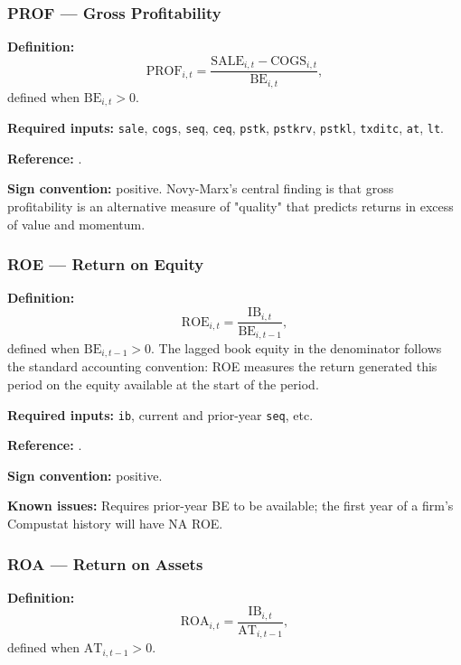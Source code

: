 \subsubsection{PROF --- Gross Profitability}

\textbf{Definition:}
\begin{equation}
\mathrm{PROF}_{i,t} = \frac{\mathrm{SALE}_{i,t} - \mathrm{COGS}_{i,t}}
                           {\mathrm{BE}_{i,t}},
\label{eq:prof}
\end{equation}
defined when $\mathrm{BE}_{i,t} > 0$.

\textbf{Required inputs:} \texttt{sale}, \texttt{cogs}, \texttt{seq},
\texttt{ceq}, \texttt{pstk}, \texttt{pstkrv}, \texttt{pstkl},
\texttt{txditc}, \texttt{at}, \texttt{lt}.

\textbf{Reference:} \cite{NovyMarx2013}.

\textbf{Sign convention:} positive. Novy-Marx's central finding is that
gross profitability is an alternative measure of "quality" that predicts
returns in excess of value and momentum.

\subsubsection{ROE --- Return on Equity}

\textbf{Definition:}
\begin{equation}
\mathrm{ROE}_{i,t} = \frac{\mathrm{IB}_{i,t}}{\mathrm{BE}_{i,t-1}},
\label{eq:roe}
\end{equation}
defined when $\mathrm{BE}_{i,t-1} > 0$. The lagged book equity in the
denominator follows the standard accounting convention: ROE measures
the return generated this period on the equity available at the start
of the period.

\textbf{Required inputs:} \texttt{ib}, current and prior-year
\texttt{seq}, etc.

\textbf{Reference:} \cite{HouXueZhang2015}.

\textbf{Sign convention:} positive.

\textbf{Known issues:} Requires prior-year BE to be available; the
first year of a firm's Compustat history will have NA ROE.

\subsubsection{ROA --- Return on Assets}

\textbf{Definition:}
\begin{equation}
\mathrm{ROA}_{i,t} = \frac{\mathrm{IB}_{i,t}}{\mathrm{AT}_{i,t-1}},
\label{eq:roa}
\end{equation}
defined when $\mathrm{AT}_{i,t-1} > 0$.

